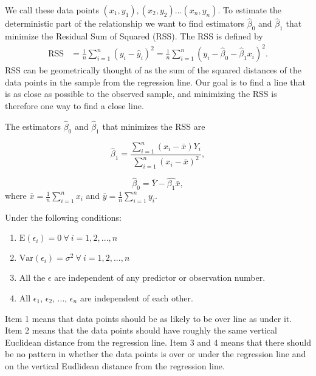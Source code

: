\documentclass{article}
\begin{document}
We call these data points \((x_1, y_1), (x_2, y_2)
... (x_n, y_n)\). To estimate the deterministic part of the relationship we want
to find estimators \(\hat{\beta}_0\) and \(\hat{\beta}_1\) that minimize the
Residual Sum of Squared (RSS). The RSS is defined by
\begin{align*}
  \mathrm{RSS} &= \frac{1}{n} \sum_{i = 1}^n \left( y_i - \hat{y}_i \right)^2 
  = \frac{1}{n} \sum_{i = 1}^n \left( y_i - \hat{\beta}_0 - \hat{\beta}_1 x_i \right)^2.
\end{align*}
RSS can be geometrically thought of as the sum of the squared distances of
the data points in the sample from the regression line. Our goal is to find a
line that is as close as possible to the observed sample, and minimizing the RSS
is therefore one way to find a close line.

The estimators \(\hat{\beta}_0\) and \(\hat{\beta}_1\) that minimizes the RSS are

\begin{equation*}
 \hat{\beta}_1 = \frac{\sum_{i = 1}^n\left( x_i - \bar{x} \right) Y_i}{\sum_{i = 1}^n\left( x_i - \bar{x} \right)^2} ,
\end{equation*}

\begin{equation*}
 \hat{\beta}_0 = \bar{Y} - \hat{\beta_1}\bar{x},
\end{equation*}
where \(\bar{x} = \frac{1}{n} \sum_{i = 1}^n x_i\) and \(\bar{y} = \frac{1}{n} \sum_{i = 1}^n y_i\).

Under the following conditions:

\begin{enumerate}
\item \(\mathrm{E} \left( \epsilon_i \right) = 0\ \forall \ i = 1, 2, ..., n\)
\item \(\mathrm{Var} \left( \epsilon_i \right) = \sigma^2\ \forall \ i = 1, 2, ..., n\)
\item All the \(\epsilon\) are independent of any predictor or observation number.
\item All \(\epsilon_1\), \(\epsilon_2\), ..., \(\epsilon_n\) are independent of each other.
\end{enumerate}

Item 1 means that data points should be as likely to be over line as under it.
Item 2 means that the data points should have roughly the same vertical
Euclidean distance from the regression line.
Item 3 and 4 means that there should be no pattern in whether the data points is over
or under the regression line and on the vertical Eudlidean distance from the
regression line.
\end{document}
